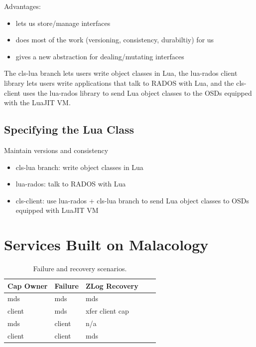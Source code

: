 \documentclass[10pt,twocolumn]{article}
\begin{document}
Advantages:

\begin{itemize}
\itemsep1pt\parskip0pt
\item
  lets us store/manage interfaces
\item
  does most of the work (versioning, consistency, durabiltiy) for us
\item
  gives a new abstraction for dealing/mutating interfaces
\end{itemize}

The cls-lua branch lets users write object classes in Lua, the lua-rados
client library lets users write applications that talk to RADOS with
Lua, and the cls-client uses the lua-rados library to send Lua object
classes to the OSDs equipped with the LuaJIT VM.

\subsection{Specifying the Lua Class}\label{specifying-the-lua-class}

Maintain versions and consistency

\begin{itemize}
\itemsep1pt\parskip0pt
\item
  cls-lua branch: write object classes in Lua
\item
  lua-rados: talk to RADOS with Lua
\item
  cls-client: use lua-rados + cls-lua branch to send Lua object classes
  to OSDs equipped with LuaJIT VM
\end{itemize}

\section{Services Built on
Malacology}\label{services-built-on-malacology}

\label{services}

\begin{table}
\begin{tabular}{ | l | l | l | l | l |}
\hline
Cap Owner & Failure & ZLog Recovery \\ \hline
mds & mds & mds \\ \hline
client & mds & xfer client cap \\ \hline
mds & client & n/a \\ \hline
client & client & mds \\
\hline
\end{tabular}
\caption{Failure and recovery scenarios.}
\label{t:mds-zlog-fail}
\end{table}
\end{document}
